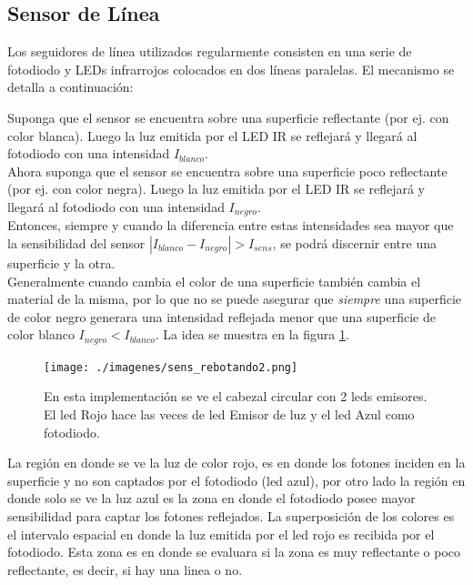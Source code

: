 \documentclass[10pt,conference,a4paper,onecolumn]{article}%
\begin{document}
\subsection{Sensor de Línea}
Los seguidores de línea utilizados regularmente consisten en una serie de fotodiodo y LEDs infrarrojos colocados en dos líneas paralelas. El mecanismo se detalla a continuación:

Suponga que el sensor se encuentra sobre una superficie reflectante (por ej. con color blanca). Luego la luz emitida por el LED IR se reflejará y llegará al fotodiodo con una intensidad $I_{blanco}$.\\
Ahora suponga que el sensor se encuentra sobre una superficie poco reflectante (por ej. con color negra). Luego la luz emitida por el LED IR se reflejará y llegará al fotodiodo con una intensidad $I_{negro}$.\\
Entonces, siempre y cuando la diferencia entre estas intensidades sea mayor que la sensibilidad del sensor  $|I_{blanco} - I_{negro} |> I_{sens}$, se podrá discernir entre una superficie y la otra. \\
Generalmente cuando cambia el color de una superficie también cambia el material de la misma, por lo que no se puede asegurar que \textit{siempre} una superficie de color negro generara una intensidad reflejada menor que una superficie de color blanco $I_{negro} <I_{blanco}$. 
 La idea se muestra en la figura \ref{fig:sensorLinea}.\\
\begin{figure}[h]
\centering
\texttt{[image: ./imagenes/sens\_rebotando2.png]}%
\caption{En esta implementación se ve el cabezal circular con 2 leds emisores. El led Rojo hace las veces de led Emisor de luz y el led Azul como fotodiodo.}
\label{fig:sensorLinea}
\end{figure}
La región en donde se ve la luz de color rojo, es en donde los fotones inciden en la superficie y no son captados por el fotodiodo (led azul), por otro lado la región en donde solo se ve la luz azul es la zona en donde el fotodiodo posee mayor sensibilidad para captar los fotones reflejados. La superposición de los colores es el intervalo espacial en donde la luz emitida por el led rojo es recibida por el fotodiodo. Esta zona es en donde se evaluara si la zona es muy reflectante o poco reflectante, es decir, si hay una linea o no.
\end{document}
